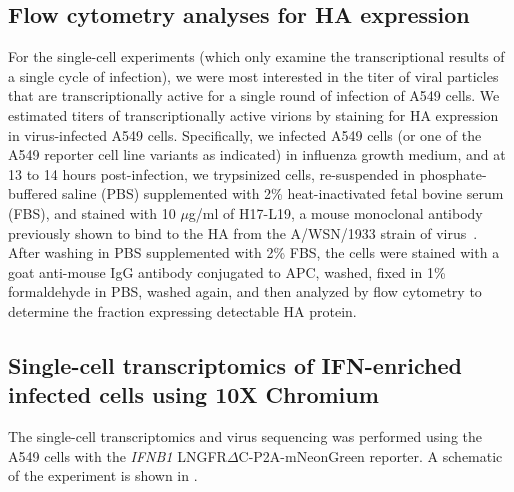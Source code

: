 \documentclass[9pt,lineno]{elife}
\begin{document}
\subsection{Flow cytometry analyses for HA expression}
For the single-cell experiments (which only examine the transcriptional results of a single cycle of infection), we were most interested in the titer of viral particles that are transcriptionally active for a single round of infection of A549 cells.
We estimated titers of transcriptionally active virions by staining for HA expression in virus-infected A549 cells.
Specifically, we infected A549 cells (or one of the A549 reporter cell line variants as indicated) in influenza growth medium, and at 13 to 14 hours post-infection, we trypsinized cells, re-suspended in phosphate-buffered saline (PBS) supplemented with 2\% heat-inactivated fetal bovine serum (FBS), and stained with 10 $\mu$g/ml of H17-L19, a mouse monoclonal antibody previously shown to bind to the HA from the A/WSN/1933 strain of virus~\citep{doud2017complete}.
After washing in PBS supplemented with 2\% FBS, the cells were stained with a goat anti-mouse IgG antibody conjugated to APC, washed, fixed in 1\% formaldehyde in PBS, washed again, and then analyzed by flow cytometry to determine the fraction expressing detectable HA protein.

\subsection{Single-cell transcriptomics of IFN-enriched infected cells using 10X Chromium}
The single-cell transcriptomics and virus sequencing was performed using the A549 cells with the \textit{IFNB1} LNGFR$\Delta$C-P2A-mNeonGreen reporter.
A schematic of the experiment is shown in .
\end{document}
